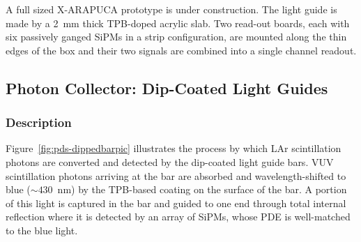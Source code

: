  A full sized X-ARAPUCA prototype is under construction. The light guide is made by a 2~mm thick TPB-doped acrylic slab. Two read-out boards, each with six passively ganged SiPMs in a strip configuration, are mounted along the thin edges of the box and their two signals are combined into a single channel readout. 
 
%
 


\subsection{Photon Collector: Dip-Coated Light Guides}
\label{ssec:fdsp-pd-pc-bar1}

\subsubsection{Description}

Figure~\ref{fig:pds-dippedbarpic} illustrates the process by which LAr scintillation photons are converted and detected by the dip-coated light guide bars.  VUV scintillation photons arriving at the bar are absorbed and wavelength-shifted to blue ($\sim430$~nm) by the TPB-based coating on the surface of the bar.  A portion of this light is captured in the bar and guided to one end through total internal reflection where it is detected by an array of SiPMs, whose PDE is well-matched to the blue light.

